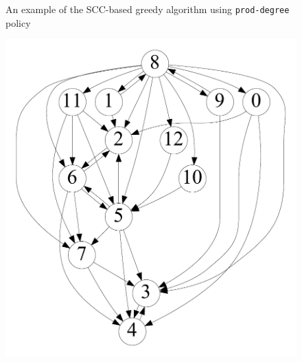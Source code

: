\begin{figure}[t]
\begin{minipage}[b]{0.19\linewidth}
   		\end{minipage}  
  	\vspace{-1em}             
   \caption{An example of the SCC-based greedy algorithm using \texttt{prod-degree} policy}
   \vspace{-1em}
   \label{fig:scc}
\end{figure}


\begin{figure}[t]
    \centering
    \begin{minipage}[b]{0.19\linewidth}
        \captionsetup{type=figure}
        \centering
        	{\includegraphics[width=\textwidth]{./alg_fig/simple-g0}}
    \end{minipage}
    \begin{minipage}[b]{0.19\linewidth}
        \centering

\end{minipage}
\end{figure}
